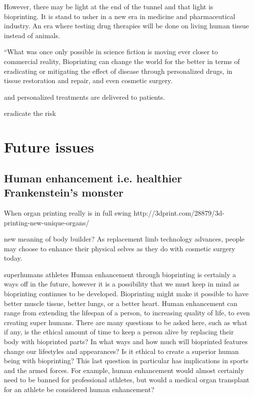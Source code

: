 \documentclass[12pt]{article} %
\begin{document}
However, there may be light at the end of the tunnel and that light is bioprinting. It is stand to usher in a new era in medicine and pharmaceutical industry. An era where testing drug therapies will be done on living human tissue instead of animals.

“What was once only possible in science fiction is moving ever closer to commercial reality,
Bioprinting can change the world for the better in terms of eradicating or mitigating the effect of disease through personalized drugs, in tissue restoration and repair, and even cosmetic surgery.

 and personalized treatments are delivered to patients.


 eradicate the risk



\newpage 


\section{Future issues} %

\subsection{Human enhancement i.e. healthier Frankenstein's monster} %
When organ printing really is in full swing
http://3dprint.com/28879/3d-printing-new-unique-organs/

new meaning of body builder?
As replacement limb technology advances, people may choose to enhance their physical selves as they do with cosmetic surgery today.

superhumans
athletes
Human enhancement through bioprinting is certainly a ways off in the future, however it is a possibility that we must keep in mind as bioprinting continues to be developed. Bioprinting might make it possible to have better muscle tissue, better lungs, or a better heart. Human enhancement can range from extending the lifespan of a person, to increasing quality of life, to even creating super humans. There are many questions to be asked here, such as what if any, is the ethical amount of time to keep a person alive by replacing their body with bioprinted parts? In what ways and how much will bioprinted features change our lifestyles and appearances? Is it ethical to create a superior human being with bioprinting? This last question in particular has implications in sports and the armed forces. For example, human enhancement would almost certainly need to be banned for professional athletes, but would a medical organ transplant for an athlete be considered human enhancement?
\end{document}
